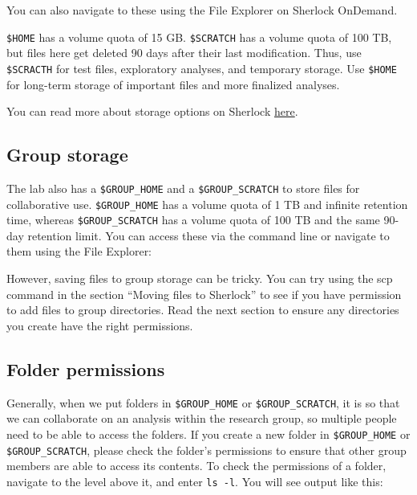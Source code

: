 \documentclass[
]{book}
\newenvironment{Shaded}{\begin{snugshade}}{\end{snugshade}}
\newcommand{\BuiltInTok}[1]{#1}
\newcommand{\NormalTok}[1]{#1}
\newcommand{\VariableTok}[1]{\textcolor[rgb]{0.00,0.00,0.00}{#1}}
\begin{document}
You can also navigate to these using the File Explorer on Sherlock OnDemand.

\texttt{\$HOME} has a volume quota of 15 GB. \texttt{\$SCRATCH} has a volume quota of 100 TB, but files here get deleted 90 days after their last modification. Thus, use \texttt{\$SCRACTH} for test files, exploratory analyses, and temporary storage. Use \texttt{\$HOME} for long-term storage of important files and more finalized analyses.

You can read more about storage options on Sherlock \href{https://www.sherlock.stanford.edu/docs/storage/}{here}.

\subsection{Group storage}\label{group-storage}

The lab also has a \texttt{\$GROUP\_HOME} and a \texttt{\$GROUP\_SCRATCH} to store files for collaborative use. \texttt{\$GROUP\_HOME} has a volume quota of 1 TB and infinite retention time, whereas \texttt{\$GROUP\_SCRATCH} has a volume quota of 100 TB and the same 90-day retention limit. You can access these via the command line or navigate to them using the File Explorer:

\begin{Shaded}
\end{Shaded}

However, saving files to group storage can be tricky. You can try using the scp command in the section ``Moving files to Sherlock'' to see if you have permission to add files to group directories. Read the next section to ensure any directories you create have the right permissions.

\subsection{Folder permissions}\label{folder-permissions}

Generally, when we put folders in \texttt{\$GROUP\_HOME} or \texttt{\$GROUP\_SCRATCH}, it is so that we can collaborate on an analysis within the research group, so multiple people need to be able to access the folders. If you create a new folder in \texttt{\$GROUP\_HOME} or \texttt{\$GROUP\_SCRATCH}, please check the folder's permissions to ensure that other group members are able to access its contents. To check the permissions of a folder, navigate to the level above it, and enter \texttt{ls\ -l}. You will see output like this:
\end{document}
